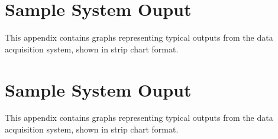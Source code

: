 \chapter{Sample System Ouput}
This appendix contains graphs representing typical outputs from the data acquisition system, shown in strip chart format.
%
%
%
%
\chapter{Sample System Ouput}
This appendix contains graphs representing typical outputs from the data acquisition system, shown in strip chart format.





